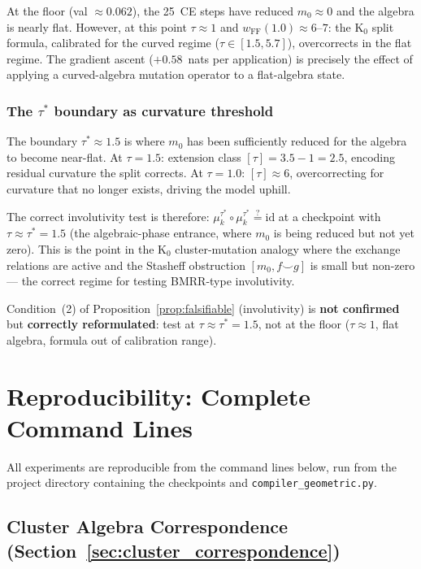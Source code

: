 \documentclass[11pt]{amsart}
\begin{document}
At the floor (val $\approx 0.062$), the 25~CE steps have
reduced $m_0 \approx 0$ and the algebra is nearly flat.
However, at this point $\tau \approx 1$ and
$w_\mathrm{FF}(1.0) \approx 6$--$7$: the K$_0$ split formula,
calibrated for the curved regime ($\tau \in [1.5, 5.7]$),
overcorrects in the flat regime.
The gradient ascent ($+0.58$~nats per application) is precisely
the effect of applying a curved-algebra mutation operator
to a flat-algebra state.

\subsubsection*{The $\tau^*$ boundary as curvature threshold}

The boundary $\tau^* \approx 1.5$ is where $m_0$ has been
sufficiently reduced for the algebra to become near-flat.
At $\tau = 1.5$: extension class $[\tau] = 3.5 - 1 = 2.5$,
encoding residual curvature the split corrects.
At $\tau = 1.0$: $[\tau] \approx 6$, overcorrecting for
curvature that no longer exists, driving the model uphill.

The correct involutivity test is therefore:
$\mu_k^{\tau^*} \circ \mu_k^{\tau^*} \stackrel{?}{=} \mathrm{id}$
at a checkpoint with $\tau \approx \tau^* = 1.5$
(the algebraic-phase entrance, where $m_0$ is being reduced
but not yet zero).
This is the point in the K$_0$ cluster-mutation analogy where
the exchange relations are active and the Stasheff obstruction
$[m_0, f \smile g]$ is small but non-zero --- the correct
regime for testing BMRR-type involutivity.

Condition~(2) of Proposition~\ref{prop:falsifiable}
(involutivity) is \textbf{not confirmed} but
\textbf{correctly reformulated}: test at $\tau \approx \tau^* = 1.5$,
not at the floor ($\tau \approx 1$, flat algebra, formula
out of calibration range).

\section{Reproducibility: Complete Command Lines}
\label{sec:commands}

All experiments are reproducible from the command lines below,
run from the project directory containing the checkpoints
and \texttt{compiler\_geometric.py}.

\subsection*{Cluster Algebra Correspondence (Section~\ref{sec:cluster_correspondence})}
\end{document}
